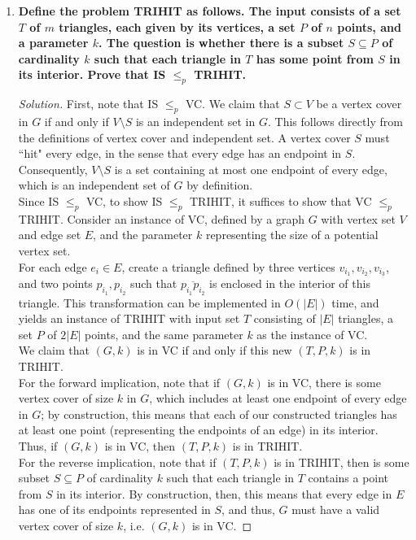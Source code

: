 \documentclass[11pt]{article}
\newenvironment{solution}
  {\renewcommand\qedsymbol{$\blacksquare$}\begin{proof}[Solution]}
  {\end{proof}}
\begin{document}
\begin{enumerate}
\newpage

\item{\textbf{Define the problem TRIHIT as follows. The input consists of a set $T$ of $m$ triangles, each
given by its vertices, a set $P$ of $n$ points, and a parameter $k$. The question is whether there
is a subset $S \subseteq P$ of cardinality $k$ such that each triangle in $T$ has some point from $S$ in its
interior. Prove that IS $\leq_p$ TRIHIT.}}

\begin{solution} First, note that IS $\leq_p$ VC. We claim that $S\subset V$ be a vertex cover in $G$ if and only if $V \setminus S$ is an independent set in $G$. This follows directly from the definitions of vertex cover and independent set. A vertex cover $S$ must ``hit" every edge, in the sense that every edge has an endpoint in $S$. Consequently, $V \setminus S$ is a set containing at most one endpoint of every edge, which is an independent set of $G$ by definition. \\

Since IS $\leq_p$ VC, to show IS $\leq_p$ TRIHIT, it suffices to show that VC $\leq_p$ TRIHIT. Consider an instance of VC, defined by a graph $G$ with vertex set $V$ and edge set $E$, and the parameter $k$ representing the size of a potential vertex set. \\

For each edge $e_i \in E$, create a triangle defined by three vertices $v_{i_1}, v_{i_2}, v_{i_3}$, and two points $p_{i_1}, p_{i_2}$ such that $\overline{p_{i_1}p_{i_2}}$ is enclosed in the interior of this triangle. This transformation can be implemented in $O(|E|)$ time, and yields an instance of TRIHIT with input set $T$ consisting of $|E|$ triangles, a set $P$ of $2|E|$ points, and the same parameter $k$ as the instance of VC. \\

We claim that $(G, k)$ is in VC if and only if this new $(T, P, k)$ is in TRIHIT. \\

For the forward implication, note that if $(G, k)$ is in VC, there is some vertex cover of size $k$ in $G$, which includes at least one endpoint of every edge in $G$; by construction, this means that each of our constructed triangles has at least one point (representing the endpoints of an edge) in its interior. Thus, if $(G, k)$ is in VC, then $(T, P, k)$ is in TRIHIT. \\

For the reverse implication, note that if $(T, P, k)$ is in TRIHIT, then is some subset $S \subseteq P$ of cardinality $k$ such that each triangle in $T$ contains a point from $S$ in its interior. By construction, then, this means that every edge in $E$ has one of its endpoints represented in $S$, and thus, $G$ must have a valid vertex cover of size $k$, i.e. $(G, k)$ is in VC. \end{solution}



\end{enumerate}
\end{document}
